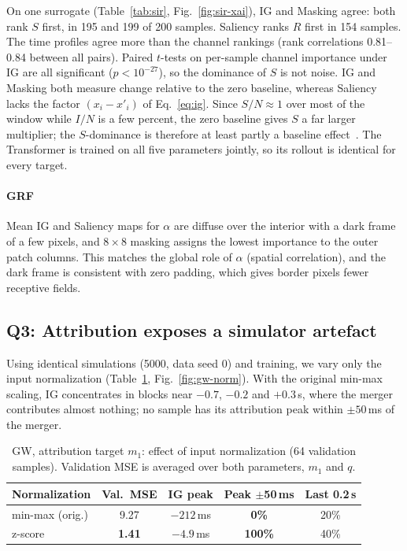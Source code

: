\documentclass[conference]{IEEEtran}
\begin{document}
On one surrogate (Table~\ref{tab:sir}, Fig.~\ref{fig:sir-xai}), IG and Masking agree: both rank $S$ first, in
195 and 199 of 200 samples. Saliency ranks $R$ first in 154 samples. The time profiles agree more than the channel
rankings (rank correlations 0.81--0.84 between all pairs). Paired $t$-tests on per-sample channel importance under
IG are all significant ($p<10^{-27}$), so the dominance of $S$ is not noise. IG and Masking both measure change
relative to the zero baseline, whereas Saliency lacks the factor $(x_i-x'_i)$ of Eq.~\eqref{eq:ig}. Since
$S/N\approx1$ over most of the window while $I/N$ is a few percent, the zero baseline gives $S$ a far larger
multiplier; the $S$-dominance is therefore at least partly a baseline effect~\cite{sturmfels2020baselines}. The
Transformer is trained on all five parameters jointly, so its rollout is identical for every target.

\paragraph{GRF} Mean IG and Saliency maps for $\alpha$ are diffuse over the interior with a dark frame of a few
pixels, and $8\times8$ masking assigns the lowest importance to the outer patch columns. This matches the global
role of $\alpha$ (spatial correlation), and the dark frame is consistent with zero padding, which gives border
pixels fewer receptive fields.

\subsection{Q3: Attribution exposes a simulator artefact}

Using identical simulations (5000, data seed 0) and training, we vary only the input normalization
(Table~\ref{tab:gw-norm}, Fig.~\ref{fig:gw-norm}). With the original min-max scaling, IG concentrates in blocks
near $-0.7$, $-0.2$ and $+0.3$\,s, where the merger contributes almost nothing; no sample has its attribution peak
within $\pm50$\,ms of the merger.

\begin{table}[!tb]
\centering
\caption{GW, attribution target $m_1$: effect of input normalization (64 validation samples). Validation MSE is averaged over both parameters, $m_1$ and $q$.}
\label{tab:gw-norm}
\footnotesize
\setlength{\tabcolsep}{3pt}
\begin{tabular}{@{}lcccc@{}}
\toprule
Normalization & Val.\ MSE & IG peak & Peak $\pm$50\,ms & Last 0.2\,s \\
\midrule
min-max (orig.) & 9.27 & $-212$\,ms & \textcolor{warn}{\textbf{0\%}} & 20\% \\
z-score & \textbf{1.41} & $-4.9$\,ms & \textbf{100\%} & 40\% \\
\bottomrule
\end{tabular}
\end{table}
\end{document}
